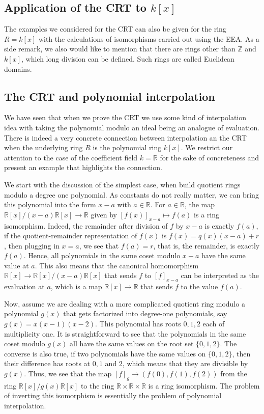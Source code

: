 \documentclass[11pt,a4paper]{amsart}
\newcommand{\Z}{{\mathbb{Z}}}
\newcommand{\R}{{\mathbb{R}}}
\begin{document}
\subsection{Application of the CRT to $k[x]$} The examples we considered for the CRT can also be given for the ring $R = k[x]$ with the calculations of isomorphisms carried out using  the EEA. As a side remark, we also would like to mention that there are rings other than $\Z$ and $k[x]$, which long division can be defined. Such rings are called Euclidean domains. 

\subsection{The CRT and polynomial interpolation} We have seen that when we prove the CRT we use some kind of interpolation idea with taking the polynomial modulo an ideal being an analogue of evaluation. There is indeed a very concrete connection between interpolation an the CRT when the underlying ring $R$ is the polynomial ring $k[x]$. We restrict our attention to the case of the coefficient field $k = \R$ for the sake of concreteness and present an example that highlights the connection. 

We start with the discussion of the simplest case, when build quotient rings modulo a degree one polynomial. As constants do not really matter, we can bring this polynomial into the form $x-a$ with $a \in \R$. For $a \in \R$, the map $\R[x] / (x-a) \R[x] \to \R$ given by $[f (x)]_{x-a} \mapsto f(a)$ is a ring isomorphism.  Indeed, the remainder after division of $f$ by $x-a$ is exactly $f(a)$, if the quotient-remainder representation of $f(x)$ is $f(x) = q(x) (x-a)+ r$, then plugging in $x=a$, we see that $f(a) = r$, that is, the remainder, is exactly $f(a)$. Hence, all polynomials in the same coset modulo $x-a$ have the same value at $a$. This also means that the canonical homomorphism $\R[x] \to \R[x] / (x-a) \R[x]$ that sends $f$ to $[f]_{x-a}$ can be interpreted as the evaluation at $a$, which is a map $\R[x] \to \R$ that sends $f$ to the value $f(a)$. 

Now, assume we are dealing with a more complicated quotient ring modulo a polynomial $g(x)$ that gets factorized into degree-one polynomials, say $g(x) = x (x-1)(x-2)$. This polynomial has roots $0, 1, 2$ each of multiplicity one. It is straightforward to see that the polynomials in the same coset modulo $g(x)$ all have the same values on the root set $\{0,1,2\}$. The converse is also true, if two polynomials have the same values on $\{0,1,2\}$, then their difference has roots at $0, 1$ and $2$, which means that they are divisible by $g(x)$. Thus, we see that the map $[f]_g \to (f(0),f(1),f(2))$ from the ring $\R[x] / g(x) \R[x]$ to the ring $\R \times \R \times \R$ is a ring isomorphism. The problem of inverting this isomorphism is essentially the problem of polynomial interpolation. 
\end{document}
